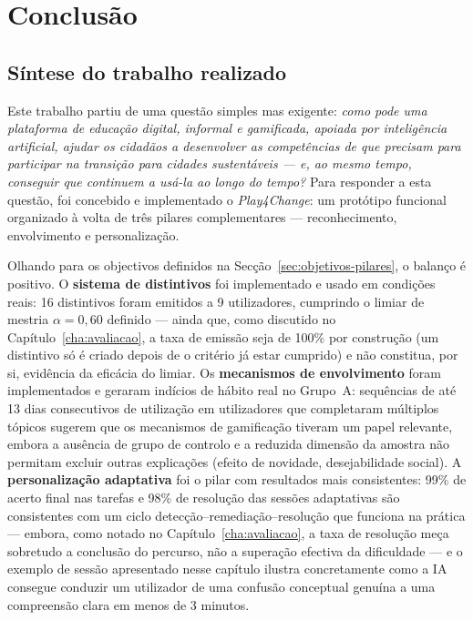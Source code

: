 %
%
\chapter{Conclusão}
\label{cha:conclusao}

\section{Síntese do trabalho realizado}
\label{sec:sintese-trabalho}

Este trabalho partiu de uma questão simples mas exigente: \emph{como pode uma plataforma de educação digital, informal e gamificada, apoiada por inteligência artificial, ajudar os cidadãos a desenvolver as competências de que precisam para participar na transição para cidades sustentáveis --- e, ao mesmo tempo, conseguir que continuem a usá-la ao longo do tempo?} Para responder a esta questão, foi concebido e implementado o \emph{Play4Change}: um protótipo funcional organizado à volta de três pilares complementares --- reconhecimento, envolvimento e personalização.

Olhando para os objectivos definidos na Secção~\ref{sec:objetivos-pilares}, o balanço é positivo. O \textbf{sistema de distintivos} foi implementado e usado em condições reais: 16 distintivos foram emitidos a 9 utilizadores, cumprindo o limiar de mestria $\alpha = 0{,}60$ definido --- ainda que, como discutido no Capítulo~\ref{cha:avaliacao}, a taxa de emissão seja de 100\% por construção (um distintivo só é criado depois de o critério já estar cumprido) e não constitua, por si, evidência da eficácia do limiar. Os \textbf{mecanismos de envolvimento} foram implementados e geraram indícios de hábito real no Grupo~A: sequências de até 13 dias consecutivos de utilização em utilizadores que completaram múltiplos tópicos sugerem que os mecanismos de gamificação tiveram um papel relevante, embora a ausência de grupo de controlo e a reduzida dimensão da amostra não permitam excluir outras explicações (efeito de novidade, desejabilidade social). A \textbf{personalização adaptativa} foi o pilar com resultados mais consistentes: 99\% de acerto final nas tarefas e 98\% de resolução das sessões adaptativas são consistentes com um ciclo detecção--remediação--resolução que funciona na prática --- embora, como notado no Capítulo~\ref{cha:avaliacao}, a taxa de resolução meça sobretudo a conclusão do percurso, não a superação efectiva da dificuldade --- e o exemplo de sessão apresentado nesse capítulo ilustra concretamente como a IA consegue conduzir um utilizador de uma confusão conceptual genuína a uma compreensão clara em menos de 3 minutos.

